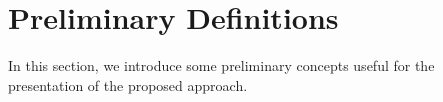 \newcommand{\lnext}{\ensuremath{\mathbf{X}}}
\newcommand{\lwnext}{\ensuremath{\mathbf{\bar{X}}}}
\newcommand{\luntil}{\ensuremath{\mathbf{U}}}
\newcommand{\lsince}{\ensuremath{\mathbf{S}}}
\newcommand{\lrelease}{\ensuremath{\mathbf{R}}}
\newcommand{\lwuntil}{\ensuremath{\mathbf{W}}}
\newcommand{\lglobally}{\ensuremath{\mathbf{G}}}
\newcommand{\lfuture}{\ensuremath{\mathbf{F}}}
\newcommand{\tnext}{\ensuremath{\mathbf{X}_{I}}}
\newcommand{\twnext}{\ensuremath{\mathbf{\bar{X}_I}}}
\newcommand{\tuntil}{\ensuremath{\mathbf{U}_{I}}}
\newcommand{\tsince}{\ensuremath{\mathbf{S}_{I}}}
\newcommand{\trelease}{\ensuremath{\mathbf{R}_{I}}}
\newcommand{\tglobally}{\ensuremath{\mathbf{G}_{I}}}
\newcommand{\lonce}{\ensuremath{\mathbf{O}}}
\newcommand{\tonce}{\ensuremath{\mathbf{O}_{I}}}

\newcommand{\lyesterday}{\ensuremath{\mathbf{Y}}}
\newcommand{\tyesterday}{\ensuremath{\mathbf{Y}_{I}}}
\newcommand{\lhistorically}{\ensuremath{\mathbf{H}}}
\newcommand{\thistorically}{\ensuremath{\mathbf{H}_{I}}}
\newcommand{\tfuture}{\ensuremath{\mathbf{F}_{I}}}



\section{Preliminary Definitions}
\label{sec:background}
In this section, we introduce some preliminary concepts useful for the presentation of the proposed approach.


